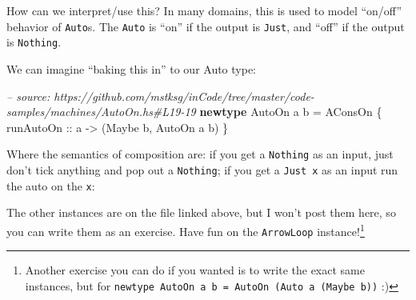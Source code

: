 \documentclass[]{article}
\newenvironment{Shaded}{}{}
\newcommand{\KeywordTok}[1]{\textcolor[rgb]{0.00,0.44,0.13}{\textbf{{#1}}}}
\newcommand{\DataTypeTok}[1]{\textcolor[rgb]{0.56,0.13,0.00}{{#1}}}
\newcommand{\CommentTok}[1]{\textcolor[rgb]{0.38,0.63,0.69}{\textit{{#1}}}}
\newcommand{\OtherTok}[1]{\textcolor[rgb]{0.00,0.44,0.13}{{#1}}}
\newcommand{\FunctionTok}[1]{\textcolor[rgb]{0.02,0.16,0.49}{{#1}}}
\newcommand{\NormalTok}[1]{{#1}}
\begin{document}
How can we interpret/use this? In many domains, this is used to model
``on/off'' behavior of \texttt{Auto}s. The \texttt{Auto} is ``on'' if
the output is \texttt{Just}, and ``off'' if the output is
\texttt{Nothing}.

We can imagine ``baking this in'' to our Auto type:

\begin{Shaded}
\begin{Highlighting}[]
\CommentTok{-- source: https://github.com/mstksg/inCode/tree/master/code-samples/machines/AutoOn.hs#L19-19}
\KeywordTok{newtype} \DataTypeTok{AutoOn} \NormalTok{a b }\FunctionTok{=} \DataTypeTok{AConsOn} \NormalTok{\{}\OtherTok{ runAutoOn ::} \NormalTok{a }\OtherTok{->} \NormalTok{(}\DataTypeTok{Maybe} \NormalTok{b, }\DataTypeTok{AutoOn} \NormalTok{a b) \}}
\end{Highlighting}
\end{Shaded}

Where the semantics of composition are: if you get a \texttt{Nothing} as
an input, just don't tick anything and pop out a \texttt{Nothing}; if
you get a \texttt{Just\ x} as an input run the auto on the \texttt{x}:

\begin{Shaded}
\end{Shaded}

The other instances are on the file linked above, but I won't post them
here, so you can write them as an exercise. Have fun on the
\texttt{ArrowLoop} instance!\footnote{Another exercise you can do if you
  wanted is to write the exact same instances, but for
  \texttt{newtype\ AutoOn\ a\ b\ =\ AutoOn\ (Auto\ a\ (Maybe\ b))} :)}
\end{document}

